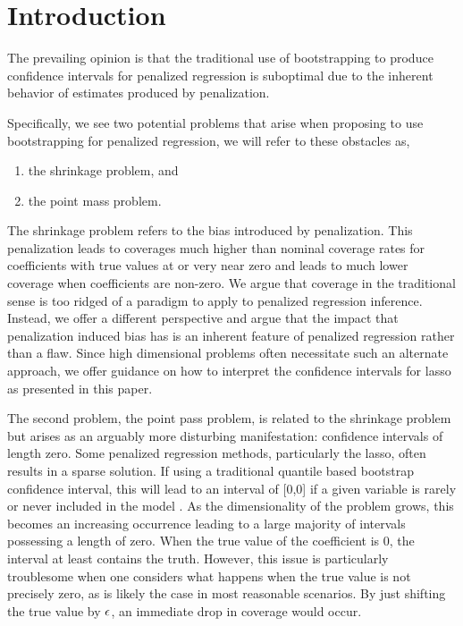 \section{Introduction}

The prevailing opinion is that the traditional use of bootstrapping to produce confidence intervals for penalized regression is suboptimal due to the inherent behavior of estimates produced by penalization.

Specifically, we see two potential problems that arise when proposing to use bootstrapping for penalized regression, we will refer to these obstacles as,

\begin{enumerate}
\item the shrinkage problem, and
\item the point mass problem.
\end{enumerate}

The shrinkage problem refers to the bias introduced by penalization. This penalization leads to coverages much higher than nominal coverage rates for coefficients with true values at or very near zero and leads to much lower coverage when coefficients are non-zero. We argue that coverage in the traditional sense is too ridged of a paradigm to apply to penalized regression inference. Instead, we offer a different perspective and argue that the impact that penalization induced bias has is an inherent feature of penalized regression rather than a flaw. Since high dimensional problems often necessitate such an alternate approach, we offer guidance on how to interpret the confidence intervals for lasso as presented in this paper.

The second problem, the point pass problem, is related to the shrinkage problem but arises as an arguably more disturbing manifestation: confidence intervals of length zero. Some penalized regression methods, particularly the lasso, often results in a sparse solution. If using a traditional quantile based bootstrap confidence interval, this will lead to an interval of [0,0] if a given variable is rarely or never included in the model . As the dimensionality of the problem grows, this becomes an increasing occurrence leading to a large majority of intervals possessing a length of zero. When the true value of the coefficient is 0, the interval at least contains the truth. However, this issue is particularly troublesome when one considers what happens when the true value is not precisely zero, as is likely the case in most reasonable scenarios. By just shifting the true value by $\epsilon$, an immediate drop in coverage would occur.

